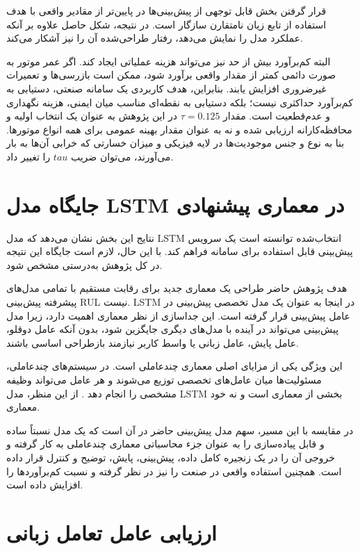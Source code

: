 قرار گرفتن بخش قابل توجهی از پیش‌بینی‌ها در پایین‌تر از مقادیر واقعی با هدف استفاده از تابع زیان نامتقارن سازگار است. در نتیجه، شکل حاصل علاوه بر آنکه عملکرد مدل را نمایش می‌دهد، رفتار طراحی‌شده آن را نیز آشکار می‌کند.

البته کم‌برآورد بیش از حد نیز می‌تواند هزینه عملیاتی ایجاد کند. اگر عمر موتور به صورت دائمی کمتر از مقدار واقعی برآورد شود، ممکن است بازرسی‌ها و تعمیرات غیرضروری افزایش یابند. بنابراین، هدف کاربردی یک سامانه صنعتی، دستیابی به کم‌برآورد حداکثری نیست؛ بلکه دستیابی به نقطه‌ای مناسب میان ایمنی، هزینه نگهداری و عدم‌قطعیت است. مقدار $\tau=0.125$ در این پژوهش به عنوان یک انتخاب اولیه و محافظه‌کارانه ارزیابی شده و نه به عنوان مقدار بهینه عمومی برای همه انواع موتورها. بنا به نوع و جنس موجودیت‌ها در لایه فیزیکی و میزان خسارتی که خرابی آن‌ها به بار می‌آورند، می‌توان ضریب $tau$ را تغییر داد.

\section{جایگاه مدل LSTM در معماری پیشنهادی}
\label{sec:lstm-role}

نتایج این بخش نشان می‌دهد که مدل LSTM انتخاب‌شده توانسته است یک سرویس پیش‌بینی قابل استفاده برای سامانه فراهم کند. با این ‌حال، لازم است جایگاه این نتیجه در کل پژوهش به‌درستی مشخص شود.

هدف پژوهش حاضر طراحی یک معماری جدید برای رقابت مستقیم با تمامی مدل‌های پیشرفته پیش‌بینی \gls{RUL} نیست. LSTM در اینجا به عنوان یک مدل تخصصی پیش‌بینی در عامل پیش‌بینی قرار گرفته است. این جداسازی از نظر معماری اهمیت دارد، زیرا مدل پیش‌بینی می‌تواند در آینده با مدل‌های دیگری جایگزین شود، بدون آنکه عامل دوقلو، عامل پایش، عامل زبانی یا واسط کاربر نیازمند بازطراحی اساسی باشند.

این ویژگی یکی از مزایای اصلی معماری چندعاملی است. در سیستم‌های چندعاملی، مسئولیت‌ها میان عامل‌های تخصصی توزیع می‌شوند و هر عامل می‌تواند وظیفه مشخصی را انجام دهد \cite{dorri2018multiagent,pretel2022masdt,lopez2024madtwin}. از این منظر، مدل LSTM بخشی از معماری است و نه خود معماری.


در مقایسه با این مسیر، سهم مدل پیش‌بینی حاضر در آن است که یک مدل نسبتاً ساده و قابل پیاده‌سازی را به عنوان جزء محاسباتی معماری چندعاملی به کار گرفته و خروجی آن را در یک زنجیره کامل داده، پیش‌بینی، پایش، توضیح و کنترل قرار داده است. همچنین استفاده واقعی در صنعت را نیز در نظر گرفته و نسبت کم‌برآورد‌ها را افزایش داده است.

\section{ارزیابی عامل تعامل زبانی}
\label{sec:llm-evaluation}

